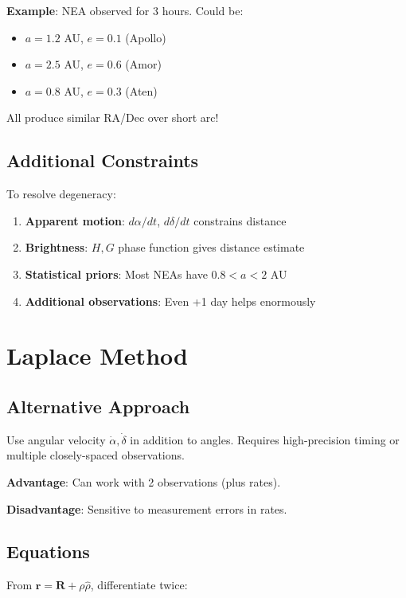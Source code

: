 \textbf{Example}: NEA observed for 3 hours. Could be:
\begin{itemize}
    \item $a = 1.2$ AU, $e = 0.1$ (Apollo)
    \item $a = 2.5$ AU, $e = 0.6$ (Amor)
    \item $a = 0.8$ AU, $e = 0.3$ (Aten)
\end{itemize}

All produce similar RA/Dec over short arc!

\subsection{Additional Constraints}

To resolve degeneracy:
\begin{enumerate}
    \item \textbf{Apparent motion}: $d\alpha/dt$, $d\delta/dt$ constrains distance
    \item \textbf{Brightness}: $H, G$ phase function gives distance estimate
    \item \textbf{Statistical priors}: Most NEAs have $0.8 < a < 2$ AU
    \item \textbf{Additional observations}: Even +1 day helps enormously
\end{enumerate}

\section{Laplace Method}

\subsection{Alternative Approach}

Use angular velocity $\dot{\alpha}, \dot{\delta}$ in addition to angles. Requires high-precision timing or multiple closely-spaced observations.

\textbf{Advantage}: Can work with 2 observations (plus rates).

\textbf{Disadvantage}: Sensitive to measurement errors in rates.

\subsection{Equations}

From $\mathbf{r} = \mathbf{R} + \rho\hat{\rho}$, differentiate twice:

